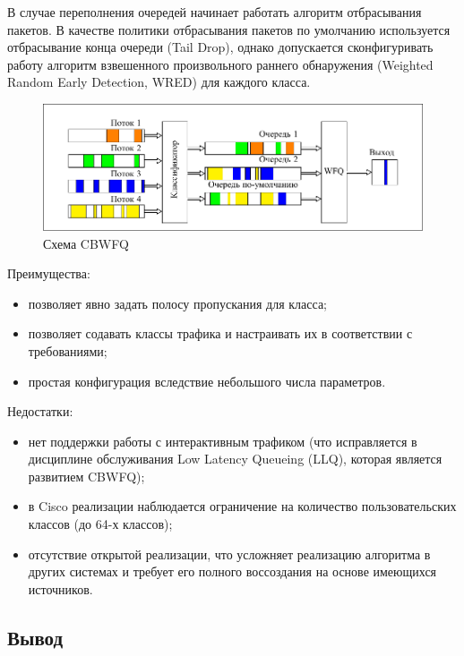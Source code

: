     В случае переполнения очередей начинает работать алгоритм отбрасывания пакетов.
    В качестве политики отбрасывания пакетов по умолчанию используется отбрасывание конца
    очереди (Tail Drop), однако допускается сконфигуривать работу
    алгоритм взвешенного произвольного раннего обнаружения (Weighted Random Early Detection, WRED)
    для каждого класса.\cite{ciscoguide}

 	\begin{figure}
		\center
    	\includegraphics[scale=1.1]{pdfimages/cbwfq.pdf}
		\caption{Схема CBWFQ}
	\end{figure}   

	Преимущества:
	\begin{itemize}
		\item позволяет явно задать полосу пропускания для класса;
		\item позволяет содавать классы трафика и настраивать их в соответствии с требованиями;
		\item простая конфигурация вследствие небольшого числа параметров.\cite{Vagesna}\cite{ciscoguide}
	\end{itemize}

	Недостатки:
	\begin{itemize}
		\item нет поддержки работы с интерактивным трафиком (что исправляется в дисциплине обслуживания Low Latency Queueing (LLQ),
		которая является развитием CBWFQ);
		\item в Cisco реализации наблюдается ограничение на количество пользовательских классов (до 64-х классов);\cite{Vagesna}
		\item отсутствие открытой реализации, что усложняет реализацию алгоритма в других системах и требует его полного воссоздания
		на основе имеющихся источников.
	\end{itemize}

	\subsection{Вывод}

